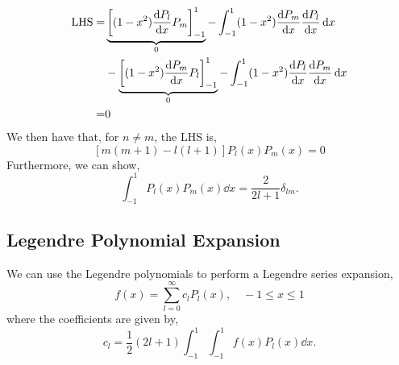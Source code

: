 \documentclass{book}
\begin{document}
\begin{equation}
	\begin{split}
		\text{LHS} = & \underbrace{\left[(1-x^2)\dv{P_l}{x}P_m\right]_{-1}^{1}}_0 - \int_{-1}^{1} (1-x^2) \dv{P_m}{x}  \dv{P_l}{x}\dd{x} \\
		& - \underbrace{\left[(1-x^2)\dv{P_m}{x}P_l\right]_{-1}^{1}}_0 - \int_{-1}^{1}(1-x^2)\dv{P_l}{x} \dv{P_m}{x}\dd{x} \\
		= & 0
	\end{split}
\end{equation}
We then have that, for $n\neq m$, the LHS is,
\begin{equation}
	\left[m(m+1)-l(l+1)\right]P_{l}(x)P_m(x) = 0
\end{equation}
Furthermore, we can show,
\begin{equation}
	\boxed{\int_{-1}^1 P_l(x)P_m(x) \dd{x} = \frac{2}{2l + 1}\delta_{lm}}.
\end{equation}
\subsection{Legendre Polynomial Expansion}
We can use the Legendre polynomials to perform a Legendre series expansion,
\begin{equation}
	f(x) = \sum_{l=0}^{\infty}c_lP_l(x), \hspace{1em} -1 \leq x \leq 1
\end{equation}
where the coefficients are given by,
\begin{equation}
	c_l = \frac{1}{2}(2l + 1)\int_{-1}^{1}\int_{-1}^{1}f(x)P_l(x)\dd{x}.
\end{equation}
\end{document}
